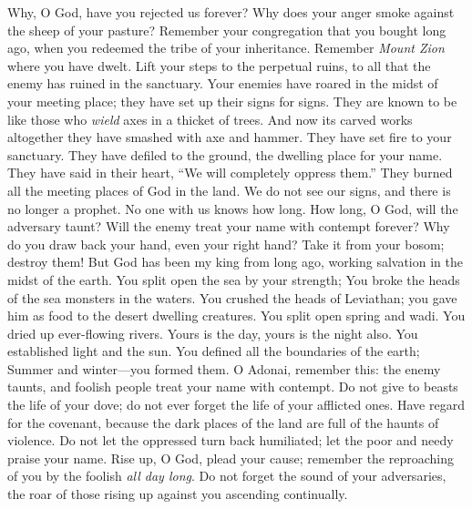 \begin{biblechapter} %
 Why, O God, have you rejected us forever? 
Why does your anger smoke 
against the sheep of your pasture?
\verse Remember your congregation that you bought long ago, 
when you redeemed the tribe of your inheritance. 
Remember \textit{Mount Zion} where you have dwelt.
\verse Lift your steps to the perpetual ruins, 
to all that the enemy has ruined in the sanctuary.
\verse Your enemies have roared in the midst of your meeting place; 
they have set up their signs for signs.
\verse They are known to be like those who \textit{wield} 
axes in a thicket of trees.
\verse And now its carved works altogether 
they have smashed with axe and hammer.
\verse They have set fire to your sanctuary. 
They have defiled to the ground, 
the dwelling place for your name.
\verse They have said in their heart, 
“We will completely oppress them.” 
They burned all the meeting places of God in the land.
\verse We do not see our signs, 
and there is no longer a prophet. 
No one with us knows how long.
\verse How long, O God, will the adversary taunt? 
Will the enemy treat your name with contempt forever?
\verse Why do you draw back your hand, even your right hand? 
Take it from your bosom; destroy them!
\verse But God has been my king from long ago, 
working salvation in the midst of the earth.
\verse You split open the sea by your strength; 
You broke the heads of the sea monsters in the waters.
\verse You crushed the heads of Leviathan; 
you gave him as food to the desert dwelling creatures.
\verse You split open spring and wadi. 
You dried up ever-flowing rivers.
\verse Yours is the day, yours is the night also. 
You established light and the sun.
\verse You defined all the boundaries of the earth; 
Summer and winter—you formed them.
\verse O Adonai, remember this: the enemy taunts, 
and foolish people treat your name with contempt.
\verse Do not give to beasts the life of your dove; 
do not ever forget the life of your afflicted ones.
\verse Have regard for the covenant, 
because the dark places of the land are full of 
the haunts of violence.
\verse Do not let the oppressed turn back humiliated; 
let the poor and needy praise your name.
\verse Rise up, O God, plead your cause; 
remember the reproaching of you by the foolish \textit{all day long}.
\verse Do not forget the sound of your adversaries, 
the roar of those rising up against you ascending continually.
\end{biblechapter}

